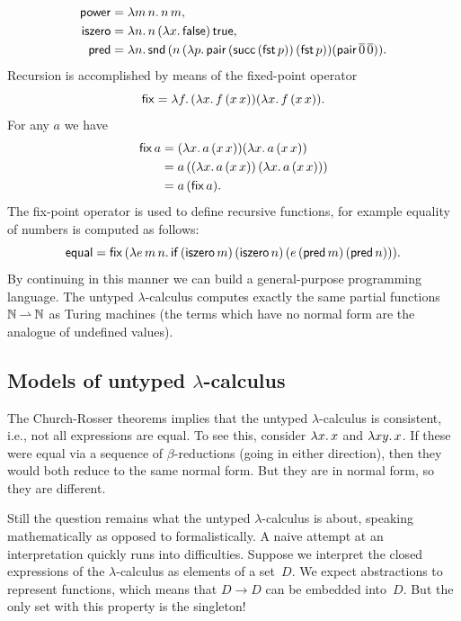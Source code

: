 %
\begin{align*}
  \mathsf{power} &= \lambda m\,n .\,n\,m,\\
  \mathsf{iszero} &= \lambda n .\,n\, (\lambda x .\,\mathsf{false})\, \mathsf{true},\\
  \mathsf{pred} &=
    \lambda n .\,
      \mathsf{snd}\, (n\, (\lambda p .\,
        \mathsf{pair}\, (\mathsf{succ}\, (\mathsf{fst}\, p))\,
        (\mathsf{fst}\, p))
      (\mathsf{pair}\, \overline{0}\, \overline{0})).
\end{align*}
%
Recursion is accomplished by means of the fixed-point operator
%
\begin{equation*}
  \mathsf{fix} = \lambda f .\,(\lambda x .\,f\,(x\,x)) (\lambda x .\,f\,(x\,x)).
\end{equation*}
%
For any $a$ we have
%
\begin{align*}
  \mathsf{fix}\,a &=
  (\lambda x .\,a\,(x\,x)) (\lambda x .\,a\,(x\,x)) \\
  &= a\,((\lambda x .\,a\,(x\,x))\,(\lambda x .\,a\,(x\,x))) \\
  &= a\,(\mathsf{fix}\,a).
\end{align*}
%
The fix-point operator is used to define recursive functions, for
example equality of numbers is computed as follows:
%
\begin{equation*}
  \mathsf{equal} = \mathsf{fix}\,(\lambda e\,m\,n .\,
    \mathsf{if}\,
    (\mathsf{iszero}\,m)\,
    (\mathsf{iszero}\,n)\,
    (e\,(\mathsf{pred}\,m)\,(\mathsf{pred}\,n))).
\end{equation*}
%
By continuing in this manner we can build a general-purpose
programming language. The untyped $\lambda$-calculus computes exactly
the same partial functions $\mathbb{N} \mathbin{\rightharpoonup} \mathbb{N}$ as Turing machines (the
terms which have no normal form are the analogue of undefined values).


\subsection{Models of untyped $\lambda$-calculus}
\label{sec:models-untyped-lambda-calculus}

The Church-Rosser theorems implies that the untyped $\lambda$-calculus
is consistent, i.e., not all expressions are equal. To see this,
consider $\lambda x .\,x$ and $\lambda x y .\,x$. If these were equal via
a sequence of $\beta$-reductions (going in either direction), then
they would both reduce to the same normal form. But they are in normal
form, so they are different.

Still the question remains what the untyped $\lambda$-calculus is
about, speaking mathematically as opposed to formalistically. A naive
attempt at an interpretation quickly runs into difficulties. Suppose
we interpret the closed expressions of the $\lambda$-calculus as
elements of a set~$D$. We expect abstractions to represent functions,
which means that $D \to D$ can be embedded into~$D$. But the only set
with this property is the singleton!


